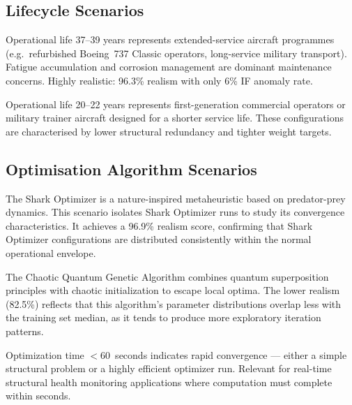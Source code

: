 \documentclass[12pt,a4paper]{article}
\begin{document}
\subsection{Lifecycle Scenarios}

\begin{tcolorbox}[rulebox, title={Operational Life Long (Realism 96.3\%)}]
Operational life 37--39 years represents extended-service aircraft programmes (e.g.\ refurbished Boeing~737 Classic operators, long-service military transport). Fatigue accumulation and corrosion management are dominant maintenance concerns. Highly realistic: 96.3\% realism with only 6\% IF anomaly rate.
\end{tcolorbox}

\begin{tcolorbox}[rulebox, title={Operational Life Short (Realism 93.3\%)}]
Operational life 20--22 years represents first-generation commercial operators or military trainer aircraft designed for a shorter service life. These configurations are characterised by lower structural redundancy and tighter weight targets.
\end{tcolorbox}

\subsection{Optimisation Algorithm Scenarios}

\begin{tcolorbox}[rulebox, title={Shark Optimizer Only (Realism 96.9\%)}]
The Shark Optimizer is a nature-inspired metaheuristic based on predator-prey dynamics. This scenario isolates Shark Optimizer runs to study its convergence characteristics. It achieves a 96.9\% realism score, confirming that Shark Optimizer configurations are distributed consistently within the normal operational envelope.
\end{tcolorbox}

\begin{tcolorbox}[rulebox, title={Chaotic Quantum Genetic Only (Realism 82.5\%)}]
The Chaotic Quantum Genetic Algorithm combines quantum superposition principles with chaotic initialization to escape local optima. The lower realism (82.5\%) reflects that this algorithm's parameter distributions overlap less with the training set median, as it tends to produce more exploratory iteration patterns.
\end{tcolorbox}

\begin{tcolorbox}[rulebox, title={Short Optimization (Realism 87.9\%)}]
Optimization time $<$60~seconds indicates rapid convergence --- either a simple structural problem or a highly efficient optimizer run. Relevant for real-time structural health monitoring applications where computation must complete within seconds.
\end{tcolorbox}
\end{document}

